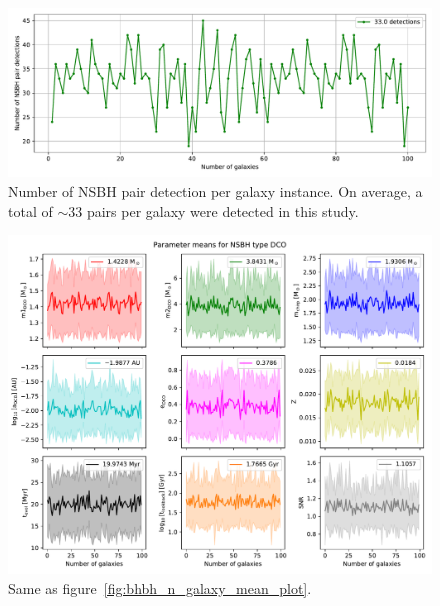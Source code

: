 \begin{figure}[!h]
	\centering
    \includegraphics[width=\columnwidth]{analysis_data/004__images_for_latex/NSBH_n_detections}
	\caption{Number of NSBH pair detection per galaxy instance. On average, a total of $\sim$33 pairs per galaxy were detected in this study.}
	\label{fig:nsbhndetections}
\end{figure}	

\begin{figure}[!h]
	\centering
    \includegraphics[width=\columnwidth]{analysis_data/004__images_for_latex/NSBH_n_galaxy_mean_plot}
	\caption{Same as figure~\ref{fig:bhbh_n_galaxy_mean_plot}.}
	\label{fig:nsbh_n_galaxy_mean_plot}
\end{figure}

\newpage

